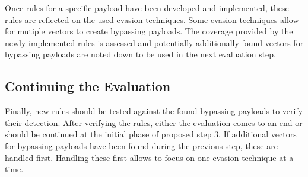 Once rules for a specific payload have been developed and implemented, these rules are reflected on the used evasion techniques. Some evasion techniques allow for mutiple vectors to create bypassing payloads. The coverage provided by the newly implemented rules is assessed and potentially additionally found vectors for bypassing payloads are noted down to be used in the next evaluation step. 
\subsection{Continuing the Evaluation}
Finally, new rules should be tested against the found bypassing payloads to verify their detection. After verifying the rules, either the evaluation comes to an end or should be continued at the initial phase of proposed step 3. If additional vectors for bypassing payloads have been found during the previous step, these are handled first. Handling these first allows to focus on one evasion technique at a time.

